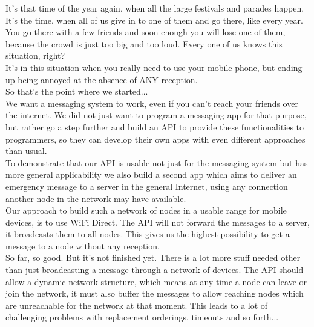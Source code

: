 It's that time of the year again, when all the large festivals and parades happen. It's the time, when all of us give in to one of them and go there, like every year. 
You go there with a few friends and soon enough you will lose one of them, because the crowd is just too big and too loud. Every one of us knows this situation, right? \\
It's in this situation when you really need to use your mobile phone, but ending up being annoyed at the absence of ANY reception. \\
So that's the point where we started... \\

We want a messaging system to work, even if you can't reach your friends over the internet. We did not just want to program a messaging app for that purpose, but rather go a step further and build an API to provide these functionalities to programmers, so they can develop their own apps with even different approaches than usual. \\
To demonstrate that our API is usable not just for the messaging system but has more general applicability we also build a second app which aims to deliver an emergency message to a server in the general Internet, using any connection another node in the network may have available. \\
Our approach to build such a network of nodes in a usable range for mobile devices, is to use WiFi Direct. The API will not forward the messages to a server, it broadcasts them to all nodes. This gives us the highest possibility to get a message to a node without any reception. \\
So far, so good. But it's not finished yet. There is a lot more stuff needed other than just broadcasting a message through a network of devices. The API should allow a dynamic network structure, which means at any time a node can leave or join the network, it must also buffer the messages to allow reaching nodes which are unreachable for the network at that moment. This leads to a lot of challenging problems with replacement orderings, timeouts and so forth... \\
